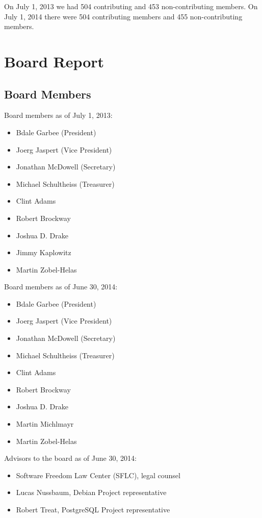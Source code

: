 \documentclass[letterpaper]{report}
\begin{document}
On July 1, 2013 we had 504 contributing and 453 non-contributing members. On
July 1, 2014 there were 504 contributing members and 455 non-contributing
members.


\chapter{Board Report}
\section{Board Members}

Board members as of July 1, 2013:

\begin{itemize}
\item Bdale Garbee (President)
\item Joerg Jaspert (Vice President)
\item Jonathan McDowell (Secretary)
\item Michael Schultheiss (Treasurer)
\item Clint Adams
\item Robert Brockway
\item Joshua D. Drake
\item Jimmy Kaplowitz
\item Martin Zobel-Helas
\end{itemize}

Board members as of June 30, 2014:

\begin{itemize}
\item Bdale Garbee (President)
\item Joerg Jaspert (Vice President)
\item Jonathan McDowell (Secretary)
\item Michael Schultheiss (Treasurer)
\item Clint Adams
\item Robert Brockway
\item Joshua D. Drake
\item Martin Michlmayr
\item Martin Zobel-Helas
\end{itemize}

Advisors to the board as of June 30, 2014:

\begin{itemize}
\item Software Freedom Law Center (SFLC), legal counsel
\item Lucas Nussbaum, Debian Project representative
\item Robert Treat, PostgreSQL Project representative
\end{itemize}
\end{document}
